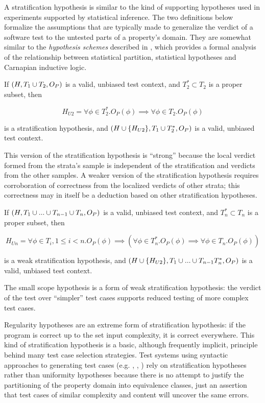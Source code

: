 A stratification hypothesis is similar to the kind of supporting hypotheses
used in experiments supported by statistical inference.
The two definitions below formalize 
the assumptions that are typically made 
to generalize the verdict of a software test
to the untested parts of a property's domain.
They are somewhat similar to 
the \emph{hypothesis schemes} described in \cite{Romeyn2004},
which provides a formal analysis of
the relationship between statistical partition, 
statistical hypotheses and Carnapian inductive logic.

\begin{df}
If $(H, T_1 \cup T_2, O_P)$ is a valid, unbiased test context,
and $T_2^{*} \subset T_2$ is a proper subset, then 

$$H_{U2} = \forall \phi \in T_2^{*}. O_P(\phi) \implies \forall \phi \in T_2. O_P(\phi)$$

\noindent
is a stratification hypothesis,
and $(H \cup\{H_{U2}\}, T_1 \cup T_2^{*}, O_P)$ is a valid, unbiased test context.
\end{df}
\noindent
This version of the stratification hypothesis is ``strong'' because
the local verdict formed from the strata's sample is independent
of the stratification and verdicts from the other samples.
A weaker version of the stratification hypothesis requires
corroboration of correctness from the localized verdicts of other strata;
this correctness may in itself be a deduction based on other stratification hypotheses.

\begin{df}
If $(H, T_1 \cup ... \cup T_{n-1} \cup T_{n}, O_P)$ is a valid, unbiased test context,
and $T_n^{*} \subset T_n$ is a proper subset, then 

$$H_{Un} = \forall \phi \in T_i, 1 \le i < n. O_P(\phi) \implies (\forall \phi \in T_n^{*}. O_P(\phi) \implies \forall \phi \in T_n. O_P(\phi))$$ 

\noindent
is a weak stratification hypothesis,
and $(H \cup\{H_{U2}\}, T_1 \cup ... \cup T_{n-1} T_n^{*}, O_P)$ 
is a valid, unbiased test context.
\end{df}

The small scope hypothesis is a form of weak stratification hypothesis:
the verdict of the test over ``simpler'' test cases
supports reduced testing of more complex test cases.

Regularity hypotheses are an extreme form of stratification hypothesis:
if the program is correct up to the set input complexity,
it is correct everywhere.
This kind of stratification hypothesis is a basic,
although frequently implicit, principle behind 
many test case selection strategies.
Test systems using syntactic approaches to generating test cases 
(e.g. \QC, \SC, \GC) rely on stratification hypotheses rather than uniformity hypotheses
because there is no attempt to justify the partitioning of the property domain 
into equivalence classes,
just an assertion that test cases of similar complexity and content will uncover the same errors.

